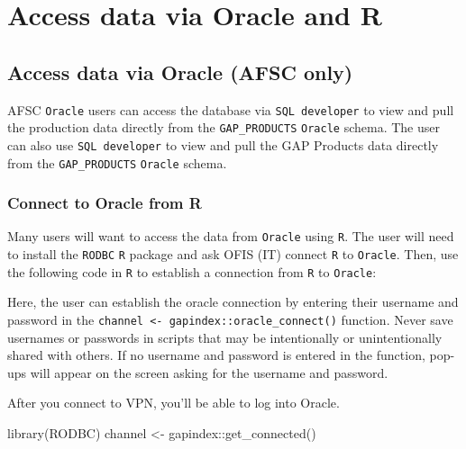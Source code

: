 \documentclass[
  letterpaper,
  oneside,
  open=any]{scrbook}
\newenvironment{Shaded}{\begin{snugshade}}{\end{snugshade}}
\newcommand{\FunctionTok}[1]{\textcolor[rgb]{0.28,0.35,0.67}{#1}}
\newcommand{\NormalTok}[1]{\textcolor[rgb]{0.00,0.23,0.31}{#1}}
\newcommand{\OtherTok}[1]{\textcolor[rgb]{0.00,0.23,0.31}{#1}}
\newcommand{\SpecialCharTok}[1]{\textcolor[rgb]{0.37,0.37,0.37}{#1}}
\begin{document}
\chapter{Access data via Oracle and
R}\label{access-data-via-oracle-and-r}

\section*{Access data via Oracle (AFSC
only)}\label{access-data-via-oracle-afsc-only}


AFSC \texttt{Oracle} users can access the database via
\texttt{SQL\ developer} to view and pull the production data directly
from the \texttt{GAP\_PRODUCTS} \texttt{Oracle} schema. The user can
also use \texttt{SQL\ developer} to view and pull the GAP Products data
directly from the \texttt{GAP\_PRODUCTS} \texttt{Oracle} schema.

\subsection{Connect to Oracle from R}\label{connect-to-oracle-from-r}

Many users will want to access the data from \texttt{Oracle} using
\texttt{R}. The user will need to install the \texttt{RODBC} \texttt{R}
package and ask OFIS (IT) connect \texttt{R} to \texttt{Oracle}. Then,
use the following code in \texttt{R} to establish a connection from
\texttt{R} to \texttt{Oracle}:

Here, the user can establish the oracle connection by entering their
username and password in the
\texttt{channel\ \textless{}-\ gapindex::oracle\_connect()} function.
Never save usernames or passwords in scripts that may be intentionally
or unintentionally shared with others. If no username and password is
entered in the function, pop-ups will appear on the screen asking for
the username and password.

After you connect to VPN, you'll be able to log into Oracle.

\begin{Shaded}
\begin{Highlighting}[]
\FunctionTok{library}\NormalTok{(RODBC)}
\NormalTok{channel }\OtherTok{\textless{}{-}}\NormalTok{ gapindex}\SpecialCharTok{::}\FunctionTok{get\_connected}\NormalTok{()}
\end{Highlighting}
\end{Shaded}
\end{document}
